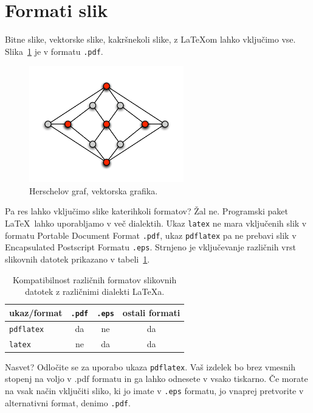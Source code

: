 \documentclass[a4paper, 12pt]{book}
\begin{document}
\section{Formati slik}

Bitne slike, vektorske slike, kakršnekoli slike, z \LaTeX{}om lahko vključimo vse.
Slika~\ref{pic1} je v formatu {\tt .pdf}.
\begin{figure}[h]
\begin{center}
\includegraphics[width=0.6\textwidth]{pic1.pdf}
\end{center}
\caption{Herschelov graf, vektorska grafika.}
\label{pic1}
\end{figure}
Pa res lahko vključimo slike katerihkoli formatov? 
Žal ne. 
Programski paket \LaTeX\ lahko uporabljamo v več dialektih. 
Ukaz {\tt latex} ne mara vključenih slik v formatu Portable Document Format {\tt .pdf}, ukaz {\tt pdflatex} pa ne prebavi slik v Encapsulated Postscript Formatu {\tt .eps}.
Strnjeno je vključevanje različnih vrst slikovnih datotek prikazano v tabeli~\ref{tbl:1}.

\begin{table}
\begin{center}
\begin{tabular}{l|ccc}
ukaz/format & {\tt .pdf} & {\tt .eps} & ostali formati \\ \hline
{\tt pdflatex} & da & ne & da \\
{\tt latex}   & ne & da  & da
\end{tabular}
\end{center}
\caption{Kompatibilnost različnih formatov slikovnih datotek z različnimi dialekti  \LaTeX a.}
\label{tbl:1}
\end{table}

Nasvet? 
Odločite se za uporabo ukaza {\tt pdflatex}. Vaš izdelek bo brez vmesnih stopenj na voljo v {.pdf} formatu in ga lahko odnesete v vsako tiskarno. 
Če morate na vsak način vključiti sliko, ki jo imate v {\tt .eps} formatu, jo vnaprej pretvorite v alternativni format, denimo {\tt .pdf}.
\end{document}
